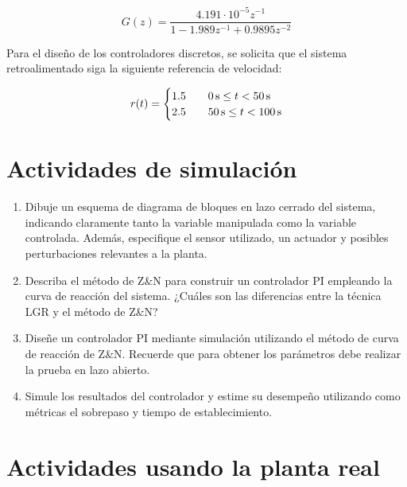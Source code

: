 \documentclass[11pt,letterpaper,notitlepage]{article}
\begin{document}
\begin{equation}
\label{tf}
G(z) = \frac{4.191 \cdot 10^{-5} z^{-1}}{  1 - 1.989 z^{-1} + 0.9895 z^{-2}}
\end{equation}

Para el diseño de los controladores discretos, se solicita que el sistema retroalimentado siga la siguiente referencia de velocidad:

\begin{equation}
\label{ref-r}
r(t) =
  \begin{cases}
    1.5 & \quad 0 \,\mbox{\si{\second}} \leq t < 50 \,\mbox{\si{\second}}\\
    2.5 & \quad 50 \,\mbox{\si{\second}} \leq t < 100 \,\mbox{\si{\second}}\\
  \end{cases}
\end{equation}



\section{Actividades de simulación}

\begin{enumerate}[\bfseries {A}1]

\item Dibuje un esquema de diagrama de bloques en lazo cerrado del sistema, indicando claramente tanto la variable manipulada como la variable controlada. Además, especifique el sensor utilizado, un actuador y posibles perturbaciones relevantes a la planta.

\item Describa el método de Z\&N para construir un controlador PI empleando la curva de reacción del sistema. ¿Cuáles son las diferencias entre la técnica LGR y el método de Z\&N?

\item Diseñe un controlador PI mediante simulación utilizando el método de curva de reacción de Z\&N. Recuerde que para obtener los parámetros debe realizar la prueba en lazo abierto.

\item Simule los resultados del controlador y estime su desempeño utilizando como métricas el sobrepaso y tiempo de establecimiento.

\end{enumerate}


\section{Actividades usando la planta real}
\end{document}
